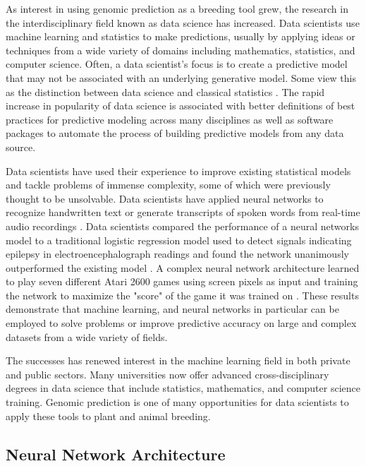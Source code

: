 As interest in using genomic prediction as a breeding tool grew, the research in 
the interdisciplinary field known as data science has increased. Data scientists 
use machine learning and statistics to make 
predictions, usually by applying ideas or techniques from a wide variety of domains 
including mathematics, statistics, and computer science. Often, a data scientist's focus is to
create a predictive model that may not be associated with an underlying generative model. 
Some view this as the distinction between data science and classical statistics 
\citep{donoho2015, breiman2001}. The rapid increase in popularity of data science
is associated with better definitions of best practices for predictive modeling
across many disciplines as well as software packages to automate the 
process of building predictive models from any data source.

Data scientists have used their experience to improve existing statistical 
models and tackle problems of immense complexity, some of which were previously 
thought to be unsolvable. Data scientists have applied neural networks to recognize 
handwritten text or generate transcripts of spoken words from real-time audio recordings \citep{lang1990}.
Data scientists compared the performance of a neural networks model to a traditional 
logistic regression model used to detect signals indicating epilepsy in electroencephalograph 
readings and found the network unanimously outperformed the existing model \citep{subasi2005}.
A complex neural network architecture learned to play seven different Atari 2600 
games using screen pixels as input and training the network to maximize the "score" of
the game it was trained on \citep{mnih2013}. These results demonstrate that machine learning,
and neural networks in particular can be employed to solve problems or improve predictive accuracy
on large and complex datasets from a wide variety of fields.

The successes has renewed interest in the machine learning field in both
private and public sectors. Many universities now offer advanced cross-disciplinary
degrees in data science that include statistics, mathematics, and computer
science training. Genomic prediction is one of many opportunities for data scientists
to apply these tools to plant and animal breeding.

\subsection*{Neural Network Architecture} \label{ssec:neuralnets}

